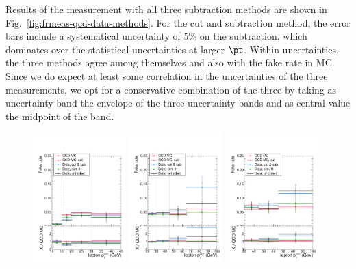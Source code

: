 Results of the measurement with all three subtraction methods are shown in Fig.~\ref{fig:frmeas-qcd-data-methods}. For the cut and subtraction method, the error bars include a systematical uncertainty of $5\%$ on the subtraction, which dominates over the statistical uncertainties at larger $\pt$. Within uncertainties, the three methods agree among themselves and also with the fake rate in MC. Since we do expect at least some correlation in the uncertainties of the three measurements, we opt for a conservative combination of the three by taking as uncertainty band the envelope of the three uncertainty bands and as central value the midpoint of the band.
\begin{figure}[htb]
        \centering
\includegraphics[width=0.32\textwidth]{plots_fakerate/measurement/fr_MuX_CombLow_eta_00_12_comp}
\includegraphics[width=0.32\textwidth]{plots_fakerate/measurement/fr_MuX_CombHigh_eta_00_12_comp}
\includegraphics[width=0.32\textwidth]{plots_fakerate/measurement/fr_Ele17_eta_00_15_comp}  \\

\end{figure}
